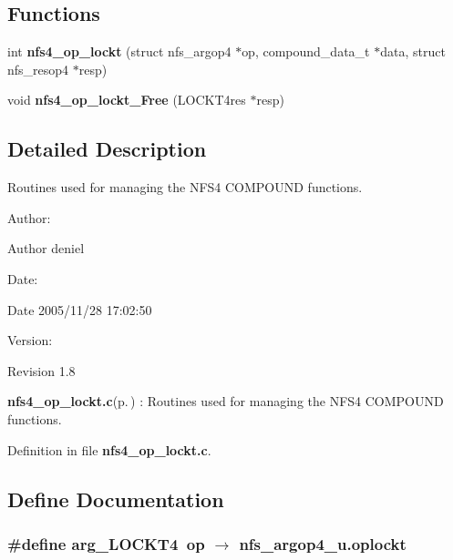 \subsection*{Functions}
\begin{CompactItemize}
\item 
int {\bf nfs4\_\-op\_\-lockt} (struct nfs\_\-argop4 $\ast$op, compound\_\-data\_\-t $\ast$data, struct nfs\_\-resop4 $\ast$resp)
\item 
void {\bf nfs4\_\-op\_\-lockt\_\-Free} (LOCKT4res $\ast$resp)
\end{CompactItemize}


\subsection{Detailed Description}
Routines used for managing the NFS4 COMPOUND functions. 

\begin{Desc}
\item[Author:]\begin{Desc}
\item[Author]deniel \end{Desc}
\end{Desc}
\begin{Desc}
\item[Date:]\begin{Desc}
\item[Date]2005/11/28 17:02:50 \end{Desc}
\end{Desc}
\begin{Desc}
\item[Version:]\begin{Desc}
\item[Revision]1.8 \end{Desc}
\end{Desc}
{\bf nfs4\_\-op\_\-lockt.c}{\rm (p.\,\pageref{nfs4__op__lockt_8c})} : Routines used for managing the NFS4 COMPOUND functions.

Definition in file {\bf nfs4\_\-op\_\-lockt.c}.

\subsection{Define Documentation}
\subsubsection{\setlength{\rightskip}{0pt plus 5cm}\#define arg\_\-LOCKT4\ op $\rightarrow$ nfs\_\-argop4\_\-u.oplockt}\label{nfs4__op__lockt_8c_a0}


